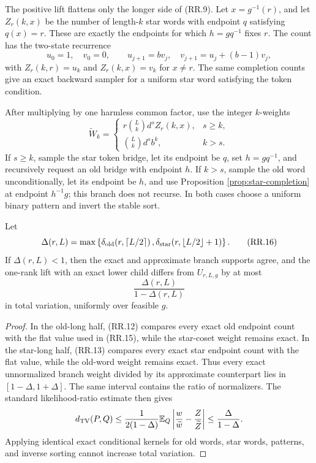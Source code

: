 The positive lift flattens only the longer side of (RR.9).  Let
$x=g^{-1}(r)$, and let $Z_r(k,x)$ be the number of length-$k$ star words with
endpoint $q$ satisfying $q(x)=r$.  These are exactly the endpoints for which
$h=gq^{-1}$ fixes $r$.  The count has the two-state recurrence
\[
  u_0=1,\quad v_0=0,\qquad
  u_{j+1}=bv_j,\quad v_{j+1}=u_j+(b-1)v_j,
  \tag{RR.14}
\]
with $Z_r(k,r)=u_k$ and $Z_r(k,x)=v_k$ for $x\ne r$.  The same completion
counts give an exact backward sampler for a uniform star word satisfying the
token condition.

After multiplying by one harmless common factor, use the integer $k$-weights
\[
  \widetilde W_k=
  \begin{cases}
  r\binom{L}{k}d^sZ_r(k,x),&s\ge k,\\[3pt]
  \binom{L}{k}d^sb^k,&k>s.
  \end{cases}
  \tag{RR.15}
\]
If $s\ge k$, sample the star token bridge, let its endpoint be $q$, set
$h=gq^{-1}$, and recursively request an old bridge with endpoint $h$.  If
$k>s$, sample the old word unconditionally, let its endpoint be $h$, and use
Proposition \ref{prop:star-completion} at endpoint $h^{-1}g$; this branch does
not recurse.  In both cases choose a uniform binary pattern and invert the
stable sort.

\begin{lemma}
\label{lem:one-rank-comparison}
Let
\[
  \Delta(r,L)=
  \max\left\{
  \delta_{\rm old}\!\left(r,\left\lceil L/2\right\rceil\right),
  \delta_{\rm star}\!\left(r,\left\lfloor L/2\right\rfloor+1\right)
  \right\}.
  \tag{RR.16}
\]
If $\Delta(r,L)<1$, then the exact and approximate branch supports agree, and
the one-rank lift with an exact lower child differs from $U_{r,L,g}$ by at
most
\[
  \frac{\Delta(r,L)}{1-\Delta(r,L)}
  \tag{RR.17}
\]
in total variation, uniformly over feasible $g$.
\end{lemma}

\begin{proof}
In the old-long half, (RR.12) compares every exact old endpoint count with
the flat value used in (RR.15), while the star-coset weight remains exact.
In the star-long half, (RR.13) compares every exact star endpoint count with
the flat value, while the old-word weight remains exact.  Thus every exact
unnormalized branch weight divided by its approximate counterpart lies in
$[1-\Delta,1+\Delta]$.  The same interval contains the ratio of normalizers.
The standard likelihood-ratio estimate then gives
\[
  d_{\mathrm{TV}}(P,Q)
  \le
  \frac{1}{2(1-\Delta)}
  \mathbb E_Q\left|
    \frac{w}{\widetilde w}
    -\frac{Z}{\widetilde Z}
  \right|
  \le \frac{\Delta}{1-\Delta}.
\]
Applying identical exact conditional kernels for old words, star words,
patterns, and inverse sorting cannot increase total variation.
\end{proof}

